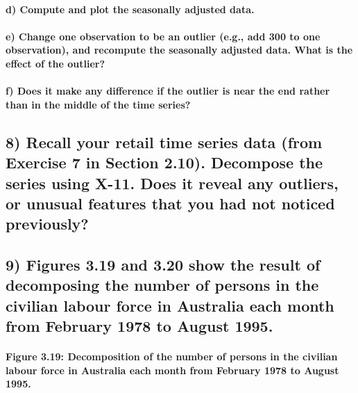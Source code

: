 \documentclass[
]{article}
\begin{document}
\paragraph{d) Compute and plot the seasonally adjusted
data.}\label{d-compute-and-plot-the-seasonally-adjusted-data.}

\paragraph{e) Change one observation to be an outlier (e.g., add 300 to
one observation), and recompute the seasonally adjusted data. What is
the effect of the
outlier?}\label{e-change-one-observation-to-be-an-outlier-e.g.-add-300-to-one-observation-and-recompute-the-seasonally-adjusted-data.-what-is-the-effect-of-the-outlier}

\paragraph{f) Does it make any difference if the outlier is near the end
rather than in the middle of the time
series?}\label{f-does-it-make-any-difference-if-the-outlier-is-near-the-end-rather-than-in-the-middle-of-the-time-series}

\subsection{8) Recall your retail time series data (from Exercise 7 in
Section 2.10). Decompose the series using X-11. Does it reveal any
outliers, or unusual features that you had not noticed
previously?}\label{recall-your-retail-time-series-data-from-exercise-7-in-section-2.10.-decompose-the-series-using-x-11.-does-it-reveal-any-outliers-or-unusual-features-that-you-had-not-noticed-previously}

\subsection{9) Figures 3.19 and 3.20 show the result of decomposing the
number of persons in the civilian labour force in Australia each month
from February 1978 to August
1995.}\label{figures-3.19-and-3.20-show-the-result-of-decomposing-the-number-of-persons-in-the-civilian-labour-force-in-australia-each-month-from-february-1978-to-august-1995.}

\paragraph{Figure 3.19: Decomposition of the number of persons in the
civilian labour force in Australia each month from February 1978 to
August
1995.}\label{figure-3.19-decomposition-of-the-number-of-persons-in-the-civilian-labour-force-in-australia-each-month-from-february-1978-to-august-1995.}
\end{document}
